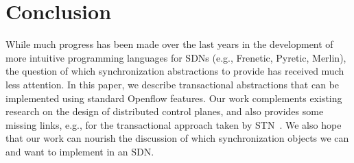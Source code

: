 \documentclass[conference]{sigcomm-alternate}
\begin{document}
\section{Conclusion}\label{sec:conclusion}

While much progress has been made over the
last years in the development of more intuitive programming
languages for SDNs (e.g., Frenetic, Pyretic, Merlin), the
question of which synchronization abstractions to provide
has received much less attention.
%
In this paper, we describe transactional abstractions that
can be implemented using standard Openflow features.
%
Our work complements existing research on the design of
distributed control planes, and also provides some missing links,
e.g., for the transactional approach taken by STN~\cite{stn}.
We also hope that our work can nourish the discussion of
which synchronization objects we can and want to implement
in an SDN.


{

}

\cleardoublepage

\onecolumn
\end{document}
